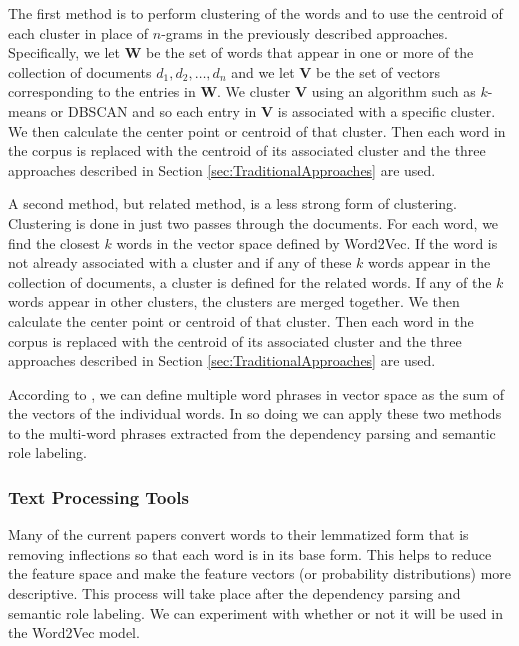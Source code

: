 \documentclass[11pt]{article}
\begin{document}
The first method is to perform clustering of the words and to use the centroid of each cluster in place of $n$-grams in the previously described approaches. Specifically, we let $\mathbf{W}$ be the set of words that appear in one or more of the collection of documents $d_1, d_2, \dots, d_n$ and we let $\mathbf{V}$ be the set of vectors corresponding to the entries in $\mathbf{W}$. We cluster $\mathbf{V}$ using an algorithm such as $k$-means or DBSCAN and so each entry in $\mathbf{V}$ is associated with a specific cluster. We then calculate the center point or centroid of that cluster. Then each word in the corpus is replaced with the centroid of its associated cluster and the three approaches described in Section \ref{sec:TraditionalApproaches} are used. 

A second method, but related method, is a less strong form of clustering. Clustering is done in just two passes through the documents. For each word, we find the closest $k$ words in the vector space defined by Word2Vec. If the word is not already associated with a cluster and if any of these $k$ words appear in the collection of documents, a cluster is defined for the related words. If any of the $k$ words appear in other clusters, the clusters are merged together. We then calculate the center point or centroid of that cluster. Then each word in the corpus is replaced with the centroid of its associated cluster and the three approaches described in Section \ref{sec:TraditionalApproaches} are used. 

According to \cite{Mikolov2013efficient}, we can define multiple word phrases in vector space as the sum of the vectors of the individual words. In so doing we can apply these two methods to the multi-word phrases extracted from the dependency parsing and semantic role labeling. 

\subsubsection{Text Processing Tools}

Many of the current papers convert words to their lemmatized form that is removing inflections so that each word is in its base form. This helps to reduce the feature space and make the feature vectors (or probability distributions) more descriptive. This process will take place after the dependency parsing and semantic role labeling. We can experiment with whether or not it will be used in the Word2Vec model. 
\end{document}
